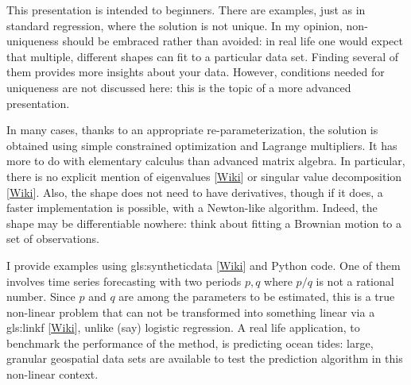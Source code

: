 \documentclass[oneside,10pt]{book}
\begin{document}
This presentation is intended to beginners. There are examples, just as in standard regression, where the solution is not unique. In my opinion, non-uniqueness should be embraced rather than avoided: in real life one would expect that multiple, different shapes can fit to a particular data set. Finding several of them provides more insights about your data. However, conditions needed for uniqueness are not discussed here: this is the topic of a more advanced presentation. 

In many cases, thanks to an appropriate re-parameterization, the solution is obtained using simple constrained optimization and Lagrange multipliers. It has more to do with elementary calculus than advanced matrix algebra. In particular, 
there is no explicit mention of \textcolor{index}{eigenvalues} 
[\href{https://en.wikipedia.org/wiki/Eigenvalues_and_eigenvectors}{Wiki}] or 
 \textcolor{index}{singular value decomposition} [\href{https://en.wikipedia.org/wiki/Singular_value_decomposition}{Wiki}]. Also, the shape does not need to have derivatives, though if it does, a faster implementation is possible, with a Newton-like algorithm. Indeed, the shape may be differentiable nowhere: think about fitting a Brownian motion to a set of observations. 

I provide examples using \gls{gls:syntheticdata} [\href{https://en.wikipedia.org/wiki/Synthetic_data}{Wiki}] and Python code. One of them involves time series forecasting with two periods $p,q$ where $p/q$ is not a rational number. Since $p$ and $q$ are among the parameters to be estimated, this is a true non-linear problem that can not be transformed into something linear via a 
 \gls{gls:linkf} [\href{https://en.wikipedia.org/wiki/Generalized_linear_model#Link_function}{Wiki}], unlike (say) logistic regression.  
A real life application, to benchmark the performance of the method, is predicting ocean tides: large, granular geospatial data sets are available to test
 the prediction algorithm in this non-linear context. 
\end{document}
